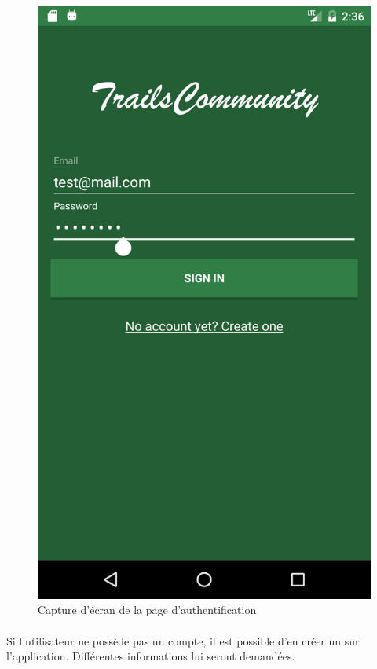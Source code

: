 \documentclass[titlepage, 12pt]{report}
\begin{document}
\begin{figure}[!h]
	\caption{Capture d'écran de la page d'authentification}
	\label{screenshots_login}
	\centering
	\includegraphics[scale=0.2]{Images/screenshots/login.png}
\end{figure}

\paragraph{}Si l'utilisateur ne possède pas un compte, il est possible d'en créer un sur l'application. Différentes informations lui seront demandées.
\end{document}
